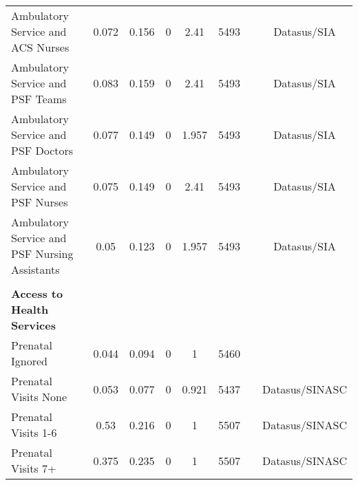 \begin{table}[H]
\begin{footnotesize}
\begin{center}
{\begin{threeparttable}[b]
\begin{tabular}{rrrrrrrr}
    \multicolumn{1}{l}{Ambulatory Service and ACS Nurses} & \multicolumn{1}{c}{0.072} & \multicolumn{1}{c}{0.156} & \multicolumn{1}{c}{0} & \multicolumn{1}{c}{2.41} & \multicolumn{1}{c}{5493} &       & \multicolumn{1}{c}{Datasus/SIA} \\
    \multicolumn{1}{l}{Ambulatory Service and PSF Teams} & \multicolumn{1}{c}{0.083} & \multicolumn{1}{c}{0.159} & \multicolumn{1}{c}{0} & \multicolumn{1}{c}{2.41} & \multicolumn{1}{c}{5493} &       & \multicolumn{1}{c}{Datasus/SIA} \\
    \multicolumn{1}{l}{Ambulatory Service and PSF Doctors} & \multicolumn{1}{c}{0.077} & \multicolumn{1}{c}{0.149} & \multicolumn{1}{c}{0} & \multicolumn{1}{c}{1.957} & \multicolumn{1}{c}{5493} &       & \multicolumn{1}{c}{Datasus/SIA} \\
    \multicolumn{1}{l}{Ambulatory Service and PSF Nurses} & \multicolumn{1}{c}{0.075} & \multicolumn{1}{c}{0.149} & \multicolumn{1}{c}{0} & \multicolumn{1}{c}{2.41} & \multicolumn{1}{c}{5493} &       & \multicolumn{1}{c}{Datasus/SIA} \\
    \multicolumn{1}{l}{Ambulatory Service and PSF Nursing Assistants} & \multicolumn{1}{c}{0.05} & \multicolumn{1}{c}{0.123} & \multicolumn{1}{c}{0} & \multicolumn{1}{c}{1.957} & \multicolumn{1}{c}{5493} &       & \multicolumn{1}{c}{Datasus/SIA} \\
          &       &       &       &       &       &       &  \\
    \multicolumn{1}{l}{\textbf{Access to Health Services}} &       &       &       &       &       &       &  \\
    \multicolumn{1}{l}{Prenatal Ignored} & \multicolumn{1}{c}{0.044} & \multicolumn{1}{c}{0.094} & \multicolumn{1}{c}{0} & \multicolumn{1}{c}{1} & \multicolumn{1}{c}{5460} &       &  \\
    \multicolumn{1}{l}{Prenatal Visits None} & \multicolumn{1}{c}{0.053} & \multicolumn{1}{c}{0.077} & \multicolumn{1}{c}{0} & \multicolumn{1}{c}{0.921} & \multicolumn{1}{c}{5437} &       & \multicolumn{1}{c}{Datasus/SINASC} \\
    \multicolumn{1}{l}{Prenatal Visits 1-6} & \multicolumn{1}{c}{0.53} & \multicolumn{1}{c}{0.216} & \multicolumn{1}{c}{0} & \multicolumn{1}{c}{1} & \multicolumn{1}{c}{5507} &       & \multicolumn{1}{c}{Datasus/SINASC} \\
    \multicolumn{1}{l}{Prenatal Visits 7+} & \multicolumn{1}{c}{0.375} & \multicolumn{1}{c}{0.235} & \multicolumn{1}{c}{0} & \multicolumn{1}{c}{1} & \multicolumn{1}{c}{5507} &       & \multicolumn{1}{c}{Datasus/SINASC} \\

\end{tabular}
\end{threeparttable}}
\end{center}
\end{footnotesize}
\end{table}
